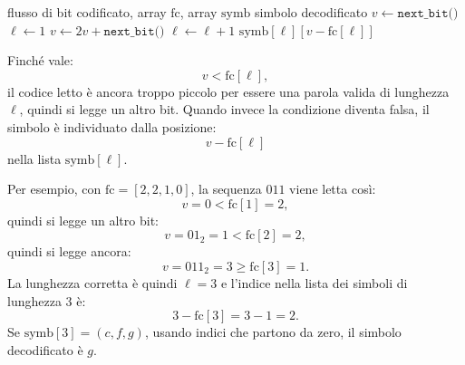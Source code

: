 \documentclass{article}
\theoremstyle{definition}
\numberwithin{equation}{section}
\begin{document}
\begin{algorithm}[htpb]
    \caption{Decodifica di una parola canonica}
    \label{alg:canonical_decoding}
    \begin{algorithmic}[1]
        \Require flusso di bit codificato, array $\text{fc}$, array $\text{symb}$
        \Ensure simbolo decodificato
        \State $v \gets \texttt{next\_bit()}$
        \State $\ell \gets 1$
        \State $v \gets 2v+\texttt{next\_bit()}$
        \State $\ell \gets \ell+1$
        \EndWhile
        \State \Return $\text{symb}[\ell][v-\text{fc}[\ell]]$
    \end{algorithmic}
\end{algorithm}

Finché vale:
\[
    v < \text{fc}[\ell],
\]
il codice letto è ancora troppo piccolo per essere una parola valida di lunghezza $\ell$, quindi si legge un altro bit. Quando invece la condizione diventa falsa, il simbolo è individuato dalla posizione:
\[
    v-\text{fc}[\ell]
\]
nella lista $\text{symb}[\ell]$.

Per esempio, con $\text{fc}=[2,2,1,0]$, la sequenza $011$ viene letta così:
\[
    v = 0 < \text{fc}[1]=2,
\]
quindi si legge un altro bit:
\[
    v = 01_2 = 1 < \text{fc}[2]=2,
\]
quindi si legge ancora:
\[
    v = 011_2=3 \geq \text{fc}[3]=1.
\]
La lunghezza corretta è quindi $\ell=3$ e l'indice nella lista dei simboli di lunghezza $3$ è:
\[
    3-\text{fc}[3]=3-1=2.
\]
Se $\text{symb}[3]=(c,f,g)$, usando indici che partono da zero, il simbolo decodificato è $g$.
\end{document}
